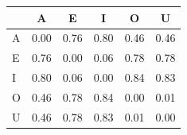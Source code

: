 \begin{tabular}{lccccc}
\toprule
\rowcolor{col01}
 & A & E & I & O & U \\
\midrule
A & 0.00 & 0.76 & 0.80 & 0.46 & 0.46 \\
E & 0.76 & 0.00 & 0.06 & 0.78 & 0.78 \\
I & 0.80 & 0.06 & 0.00 & 0.84 & 0.83 \\
O & 0.46 & 0.78 & 0.84 & 0.00 & 0.01 \\
U & 0.46 & 0.78 & 0.83 & 0.01 & 0.00 \\
\bottomrule
\end{tabular}
